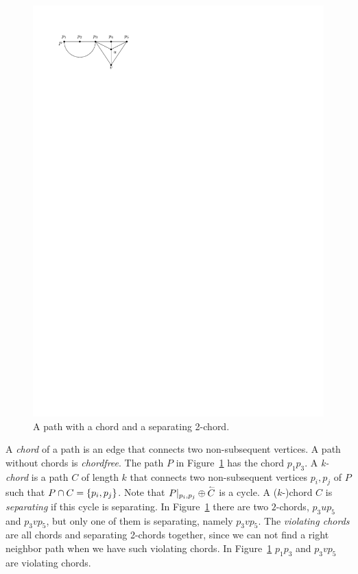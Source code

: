     \begin{figure}[!b]
      \centering
      \includegraphics[scale=1]{unifiedAlgo/img/rightNeighbourwalk/chords.pdf}
      \caption{A path with a chord and a separating 2-chord.}
      \label{fig:right:chord}
    \end{figure}

    A \emph{chord} of a path is an edge that connects two non-subsequent vertices. A path without chords is \emph{chordfree}. The path $P$ in Figure~\ref{fig:right:chord} has the chord $p_1 p_3$.
    A \emph{k-chord} is a path $C$ of length $k$ that connects two non-subsequent vertices $p_i, p_j$ of $P$ such that $P \cap C = \left\lbrace {p_i, p_j} \right\rbrace$.
    Note that $P|_{p_i, p_j} \oplus \accentset{\leftharpoonup}{C}$ is a cycle.
    A ($k$-)chord $C$ is \emph{separating} if this cycle is separating.
    In Figure~\ref{fig:right:chord} there are two $2$-chords, $p_3 u p_5$ and $p_3 v p_5$, but only one of them is separating, namely $p_3 v p_5$.
    The \emph{violating chords} are all chords and separating 2-chords together, since we can not find a right neighbor path when we have such violating chords. In Figure~\ref{fig:right:chord} $p_1p_3$ and $p_3 v p_5$ are violating chords.

